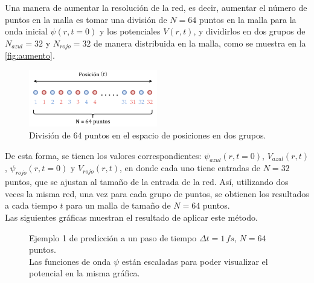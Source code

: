 Una manera de aumentar la resolución de la red, es decir, aumentar el número de puntos en la malla es tomar una división de $N=64$ puntos en la malla para la onda inicial $\psi(r,t=0)$ y los potenciales $V(r,t)$, y dividirlos en dos grupos de $N_{azul}=32$ y $N_{rojo}=32$ de manera distribuida en la malla, como se muestra en la \autoref{fig:aumento}. 

\begin{figure}[H]
  \centering
  \includegraphics[width=0.5\textwidth]{./img/aumento.drawio.png}
  \caption{División de 64 puntos en el espacio de posiciones en dos grupos.}
  \label{fig:aumento}
\end{figure}

De esta forma, se tienen los valores correspondientes: $\psi_{azul}(r,t=0)$, $V_{azul}(r,t)$, $\psi_{rojo}(r,t=0)$ y $V_{rojo}(r,t)$, en donde cada uno tiene entradas de $N=32$ puntos, que se ajustan al tamaño de la entrada de la red. Así, utilizando dos veces la misma red, una vez para cada grupo de puntos, se obtienen los resultados a cada tiempo $t$ para un malla de tamaño de $N=64$ puntos.
\\
Las siguientes gráficas muestran el resultado de aplicar este método.

\begin{figure}[H]
  \centering
  \caption{Ejemplo 1 de predicción a un paso de tiempo $\Delta t = 1\,fs$, $N=64$ puntos.\\ Las funciones de onda $\psi$ están escaladas para poder visualizar el potencial en la misma gráfica.}
  \label{fig:1step164}
\end{figure}

